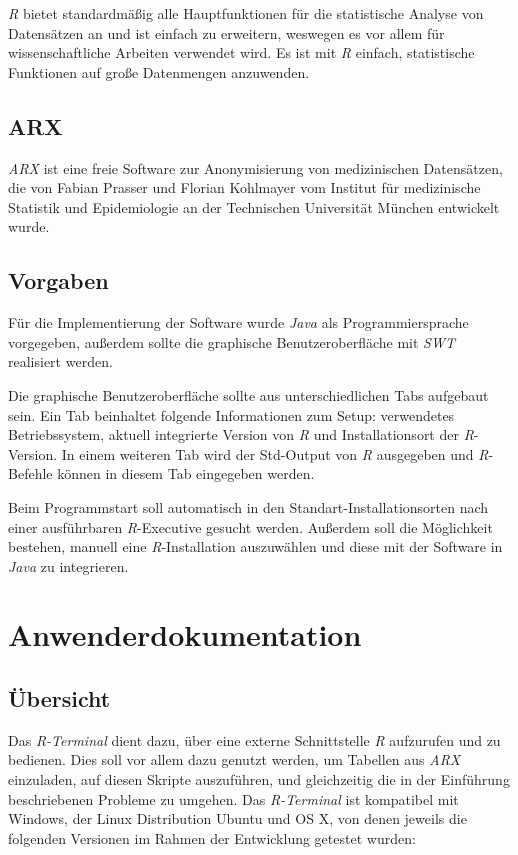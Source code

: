 \documentclass[a4paper, 12pt]{report} %
\begin{document}
\textit{R} bietet standardmäßig alle Hauptfunktionen für die statistische Analyse von Datensätzen an und ist einfach zu erweitern, weswegen es vor allem für wissenschaftliche Arbeiten verwendet wird. Es ist mit \textit{R} einfach, statistische Funktionen auf große Datenmengen anzuwenden. \cite{rproject}



\section*{ARX}
\textit{ARX} ist eine freie Software zur Anonymisierung von medizinischen Datensätzen, die von Fabian Prasser und Florian Kohlmayer vom Institut für medizinische Statistik und Epidemiologie an der Technischen Universität München entwickelt wurde. \cite{arx}


\section*{Vorgaben}

Für die Implementierung der Software wurde \textit{Java} als Programmiersprache vorgegeben, außerdem sollte die graphische Benutzeroberfläche mit \textit{SWT} realisiert werden.

Die graphische Benutzeroberfläche sollte aus unterschiedlichen Tabs aufgebaut sein. Ein Tab beinhaltet folgende Informationen zum Setup: verwendetes Betriebssystem, aktuell integrierte Version von \textit{R} und Installationsort der \textit{R}-Version. In einem weiteren Tab wird der Std-Output von \textit{R} ausgegeben und \textit{R}-Befehle können in diesem Tab eingegeben werden. 

Beim Programmstart soll automatisch in den Standart-Installationsorten nach einer ausführbaren \textit{R}-Executive gesucht werden. Außerdem soll die Möglichkeit bestehen, manuell eine \textit{R}-Installation auszuwählen und diese mit der Software in \textit{Java} zu integrieren. 


\chapter{Anwenderdokumentation}
\section{Übersicht}
Das \textit{R-Terminal} dient dazu, über eine externe Schnittstelle \textit{R} aufzurufen und zu bedienen. Dies soll vor allem dazu genutzt werden, um Tabellen aus \textit{ARX} einzuladen, auf diesen Skripte auszuführen, und gleichzeitig die in der Einführung beschriebenen Probleme zu umgehen. Das \textit{R-Terminal} ist kompatibel mit Windows, der Linux Distribution Ubuntu und OS X, von denen jeweils die folgenden Versionen im Rahmen der Entwicklung getestet wurden: 
\end{document}
